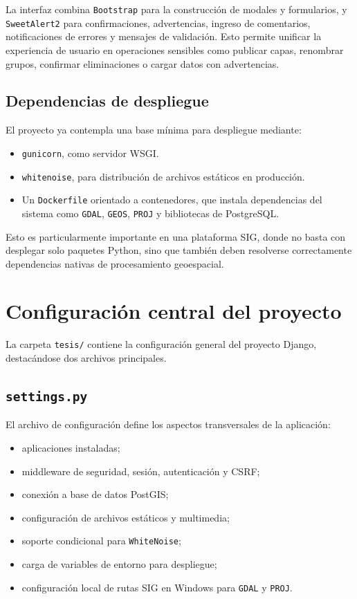 \documentclass[12pt,a4paper]{report}
\begin{document}
La interfaz combina \texttt{Bootstrap} para la construcci\'on de modales y formularios, y \texttt{SweetAlert2} para confirmaciones, advertencias, ingreso de comentarios, notificaciones de errores y mensajes de validaci\'on. Esto permite unificar la experiencia de usuario en operaciones sensibles como publicar capas, renombrar grupos, confirmar eliminaciones o cargar datos con advertencias.

\subsection{Dependencias de despliegue}

El proyecto ya contempla una base m\'inima para despliegue mediante:

\begin{itemize}
    \item \texttt{gunicorn}, como servidor WSGI.
    \item \texttt{whitenoise}, para distribuci\'on de archivos est\'aticos en producci\'on.
    \item Un \texttt{Dockerfile} orientado a contenedores, que instala dependencias del sistema como \texttt{GDAL}, \texttt{GEOS}, \texttt{PROJ} y bibliotecas de PostgreSQL.
\end{itemize}

Esto es particularmente importante en una plataforma SIG, donde no basta con desplegar solo paquetes Python, sino que tambi\'en deben resolverse correctamente dependencias nativas de procesamiento geoespacial.

\section{Configuraci\'on central del proyecto}

La carpeta \texttt{tesis/} contiene la configuraci\'on general del proyecto Django, destac\'andose dos archivos principales.

\subsection{\texttt{settings.py}}

El archivo de configuraci\'on define los aspectos transversales de la aplicaci\'on:

\begin{itemize}
    \item aplicaciones instaladas;
    \item middleware de seguridad, sesi\'on, autenticaci\'on y CSRF;
    \item conexi\'on a base de datos PostGIS;
    \item configuraci\'on de archivos est\'aticos y multimedia;
    \item soporte condicional para \texttt{WhiteNoise};
    \item carga de variables de entorno para despliegue;
    \item configuraci\'on local de rutas SIG en Windows para \texttt{GDAL} y \texttt{PROJ}.
\end{itemize}
\end{document}
